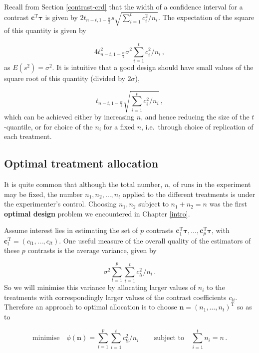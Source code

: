 \documentclass[
]{book}
\theoremstyle{definition}
\theoremstyle{definition}
\theoremstyle{definition}
\theoremstyle{definition}
\theoremstyle{remark}
\begin{document}
Recall from Section \ref{contrast-crd} that the width of a confidence interval for a contrast \(\boldsymbol{c}^{\mathrm{T}}\boldsymbol{\tau}\) is given by \(2t_{n-t, 1-\frac{\alpha}{2}}s\sqrt{\sum_{i=1}^tc_i^2/n_i}\). The expectation of the square of this quantity is given by

\[
4t^2_{n-t, 1-\frac{\alpha}{2}}\sigma^2\sum_{i=1}^tc_i^2/n_i\,,
\]
as \(E(s^2) = \sigma^2\). It is intuitive that a good design should have small values of the square root of this quantity (divided by \(2\sigma\)),

\[
t_{n-t, 1-\frac{\alpha}{2}}\sqrt{\sum_{i=1}^tc_i^2/n_i}\,,
\]
which can be achieved either by increasing \(n\), and hence reducing the size of the \(t\)-quantile, or for choice of the \(n_i\) for a fixed \(n\), i.e.~through choice of replication of each treatment.

\hypertarget{crd-opt-all}{%
\subsection{Optimal treatment allocation}\label{crd-opt-all}}

It is quite common that although the total number, \(n\), of runs in the experiment may be fixed, the number \(n_1, n_2, \ldots, n_t\) applied to the different treatments is under the experimenter's control. Choosing \(n_1, n_2\) subject to \(n_1+n_2 = n\) was the first \textbf{optimal design} problem we encountered in Chapter \ref{intro}.

Assume interest lies in estimating the set of \(p\) contrasts \(\boldsymbol{c}_1^{\mathrm{T}}\boldsymbol{\tau}, \ldots, \boldsymbol{c}_p^{\mathrm{T}}\boldsymbol{\tau}\), with \(\boldsymbol{c}_l^{\mathrm{T}} = (c_{l1}, \ldots, c_{lt})\). One useful measure of the overall quality of the estimators of these \(p\) contrasts is the average variance, given by

\[
\sigma^2\sum_{l=1}^p\sum_{i=1}^tc_{li}^2/n_i\,.
\]
So we will minimise this variance by allocating larger values of \(n_i\) to the treatments with correspondingly larger values of the contrast coefficients \(c_{li}\). Therefore an approach to optimal allocation is to choose \(\boldsymbol{n} = (n_1, \ldots, n_t)^{\mathrm{T}}\) so as to

\begin{equation}
\mbox{minimise} \quad \phi(\boldsymbol{n}) = \sum_{l=1}^p\sum_{i=1}^tc_{li}^2/n_i\,\qquad \mbox{subject to} \quad \sum_{i=1}^tn_i = n\,.
\label{eq:opt-all}
\end{equation}
\end{document}
